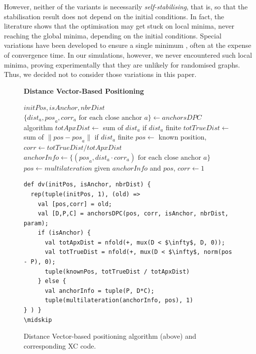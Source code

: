 \documentclass[runningheads]{llncs}
\begin{document}
However, neither of the variants is necessarily \emph{self-stabilising}, that is, so that the stabilisation result does not depend on the initial conditions. In fact, the literature shows \cite{11205997} that the optimisation may get stuck on local minima, never reaching the global minima, depending on the initial conditions. Special variations have been developed to ensure a single minimum \cite{11205997}, often at the expense of convergence time. In our simulations, however, we never encountered such local minima, proving experimentally that they are unlikely for randomised graphs. Thus, we decided not to consider those variations in this paper.

\begin{figure}[t]
\textbf{Distance Vector-Based Positioning}
\begin{algorithmic}[1]
    \Require $\mathit{initPos}, \mathit{isAnchor}, \mathit{nbrDist}$
        \State $\{\mathit{dist}_a, \mathit{pos}_a, \mathit{corr}_a \text{ for each close anchor } a\} \gets \mathit{anchorsDPC}$ algorithm 
            \State $\mathit{totApxDist} \gets$ sum of $\mathit{dist}_a$ if $\mathit{dist}_a$ finite
            \State $\mathit{totTrueDist} \gets$ sum of $\rVert \mathit{pos} - \mathit{pos}_a \lVert$ if $\mathit{dist}_a$ finite
            \State \Return $\mathit{pos} \gets$ known position, $\mathit{corr} \gets \mathit{totTrueDist} / \mathit{totApxDist}$
        \Else
            \State $\mathit{anchorInfo} \gets \{(\mathit{pos}_a, \mathit{dist}_a \cdot \mathit{corr}_a) \text{ for each close anchor } a\}$
            \State \Return $\mathit{pos} \gets \mathit{multilateration}$ given $\mathit{anchorInfo}$ and $\mathit{pos}$, $\mathit{corr} \gets 1$
        \EndIf
    \EndOld
\end{algorithmic}
\medskip
\begin{lstlisting}[language=xc,mathescape]
def dv(initPos, isAnchor, nbrDist) {
  rep(tuple(initPos, 1), (old) =>
    val [pos,corr] = old;
    val [D,P,C] = anchorsDPC(pos, corr, isAnchor, nbrDist, param);
    if (isAnchor) {
      val totApxDist = nfold(+, mux(D < $\infty$, D, 0));
      val totTrueDist = nfold(+, mux(D < $\infty$, norm(pos - P), 0);
      tuple(knownPos, totTrueDist / totApxDist)
    } else {
      val anchorInfo = tuple(P, D*C);
      tuple(multilateration(anchorInfo, pos), 1)
} ) }
\midskip
\end{lstlisting}
    \caption{Distance Vector-based positioning algorithm (above) and corresponding  XC code.}
    \label{code:dv}
\end{figure}
\end{document}
